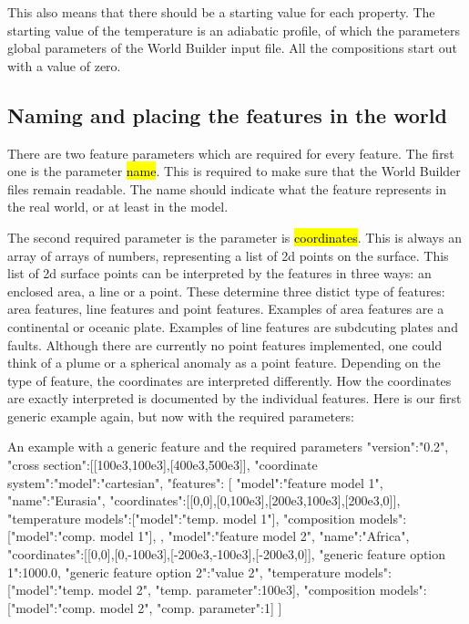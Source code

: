\documentclass{book}
\newcommand{\WB}{{World Builder}}
\begin{document}
This also means that there should be a starting value for each property. The starting value of the temperature is an adiabatic profile, of which the parameters global parameters of the \WB{} input file. All the compositions start out with a value of zero.

\subsection{Naming and placing the features in the world}
There are two feature parameters which are required for every feature. The first one is the parameter \hl{name}. This is required to make sure that the \WB{} files remain readable. The name should indicate what the feature represents in the real world, or at least in the model. 

The second required parameter is the parameter is \hl{coordinates}. This is always an array of arrays of numbers, representing a list of 2d points on the surface. This list of 2d surface points can be interpreted by the features in three ways: an enclosed area, a line or a point. These determine three distict type of features: area features, line features and point features. Examples of area features are a continental or oceanic plate. Examples of line features are subdcuting plates and faults. Although there are currently no point features implemented, one could think of a plume or a spherical anomaly as a point feature. Depending on the type of feature, the coordinates are interpreted differently. How the coordinates are exactly interpreted is documented by the individual features. Here is our first generic example again, but now with the required parameters:

\begin{javascriptcode}{An example with a generic feature and the required parameters}{}
{
  "version":"0.2",
  "cross section":[[100e3,100e3],[400e3,500e3]],
  "coordinate system":{"model":"cartesian"},
  "features":
  [
    {
      "model":"feature model 1",
      "name":"Eurasia",
      "coordinates":[[0,0],[0,100e3],[200e3,100e3],[200e3,0]],
      "temperature models":[{"model":"temp. model 1"}],
      "composition models":[{"model":"comp. model 1"}],
    },
    {
      "model":"feature model 2",
      "name":"Africa",
      "coordinates":[[0,0],[0,-100e3],[-200e3,-100e3],[-200e3,0]],
      "generic feature option 1":1000.0,
      "generic feature option 2":"value 2",
      "temperature models":[{"model":"temp. model 2", "temp. parameter":100e3}],
      "composition models":[{"model":"comp. model 2", "comp. parameter":1}]
    }
  ]
}
\end{javascriptcode}
\end{document}
